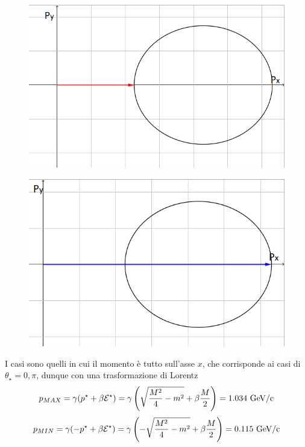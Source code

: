 \documentclass[12pt,twoside,a4]{article}
\begin{document}
\begin{solution}
\begin{figure}[htbp]
\centering
\includegraphics[scale=0.5]{1_es.png}
\end{figure}
\newpage
\begin{figure}[htbp]
\centering
\hspace{11pt}
\includegraphics[scale=0.5]{2_es.png}
\end{figure}
\vspace{1em}


I casi sono quelli in cui il momento è tutto sull'asse $x$, che corrisponde ai casi di $\theta_\star = 0, \pi$, dunque con una trasformazione di Lorentz
$$ p_{MAX} = \gamma(p^\star + \beta \mathcal{E}^\star) = \gamma \left({\sqrt{\frac{M^2}{4}-m^2} + \beta \frac{M}{2}}\right) = 1.034 \mbox{ GeV/c}$$
$$ p_{MIN} = \gamma(-p^\star + \beta \mathcal{E}^\star) = \gamma \left({-\sqrt{\frac{M^2}{4}-m^2} + \beta \frac{M}{2}}\right) = 0.115 \mbox{ GeV/c}$$
\end{solution}
\end{document}
